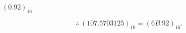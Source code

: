 \begin{minipage}{\linewidth}
\begin{minipage}[t]{.48\linewidth}
$ (0.92)_{16} $
\end{minipage}\par
\[\therefore\ (107.5703125)_{10}=(6B.92)_{16}.\]
\end{minipage}\par

